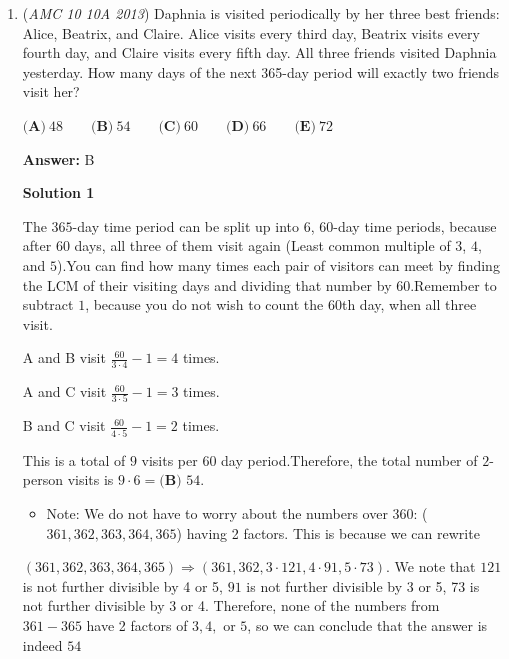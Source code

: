 \begin{enumerate}
 Since it is reflected around $x=8$, the point $(8,-3)$ remains the same on both. The top right corners are $(6,5)$, and its reflection $(10,5)$. Now to find the 4th point, point F, we can use the equation of the line DE($\frac{4}{3}x - \frac{25}{3}$, and substitute $x=8$, to get $\frac{7}{3}$. Now we can use the theorem: $\frac{1}{2}(((6*-3)+(10*5)+(8*5)+(\frac{7}{3}*8))-((8*5)+(6*5)+(10*\frac{7}{3}) + (8* -3))) = \boxed{\textbf{(E) }\frac{32}{3}}$



	\item (\textit{AMC 10 10A 2013}) Daphnia is visited periodically by her three best friends: Alice, Beatrix, and Claire.  Alice visits every third day, Beatrix visits every fourth day, and Claire visits every fifth day.  All three friends visited Daphnia yesterday.  How many days of the next 365-day period will exactly two friends visit her?


 $\textbf{(A)}\ 48\qquad\textbf{(B)}\ 54\qquad\textbf{(C)}\ 60\qquad\textbf{(D)}\ 66\qquad\textbf{(E)}\ 72$

 \textbf{Answer: }B



\textbf{Solution 1}

The $365$-day time period can be split up into $6$, $60$-day time periods, because after $60$ days, all three of them visit again (Least common multiple of $3$, $4$, and $5$).You can find how many times each pair of visitors can meet by finding the LCM of their visiting days and dividing that number by 60.Remember to subtract $1$, because you do not wish to count the $60$th day, when all three visit.

 A and B visit $\frac{60}{3 \cdot 4}-1 = 4$ times.

 A and C visit $\frac{60}{3 \cdot 5}-1 = 3$ times.

 B and C visit $\frac{60}{4 \cdot 5}-1 = 2$ times.

 
This is a total of $9$ visits per $60$ day period.Therefore, the total number of $2$-person visits is $9 \cdot 6 = \boxed{\textbf{(B) }54}$.

 
            \begin{itemize}
        \item Note: We do not have to worry about the numbers over 360: ($361,362,363,364,365$) having 2 factors. This is because we can rewrite
            \end{itemize}
            $(361,362,363,364,365) \Rightarrow (361,362, 3\cdot 121, 4 \cdot 91, 5 \cdot 73)$. We note that $121$ is not further divisible by 4 or 5, $91$ is not further divisible by 3 or 5, 73 is not further divisible by 3 or 4. Therefore, none of the numbers from $361-365$ have 2 factors of $3,4,$ or $5$, so we can conclude that the answer is indeed $\boxed{54}$





\end{enumerate}
